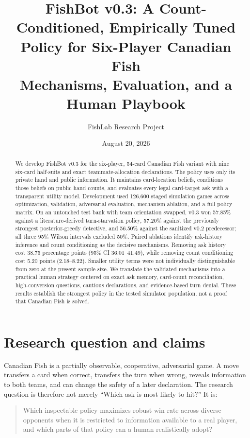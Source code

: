 \documentclass[11pt]{article}
\title{\textbf{FishBot v0.3: A Count-Conditioned, Empirically Tuned Policy for Six-Player Canadian Fish}\\[4pt]
\large Mechanisms, Evaluation, and a Human Playbook}
\author{FishLab Research Project}
\date{August 20, 2026}
\begin{document}
\maketitle

\begin{abstract}
We develop FishBot v0.3 for the six-player, 54-card Canadian Fish variant with nine six-card half-suits and exact teammate-allocation declarations. The policy uses only its private hand and public information. It maintains card-location beliefs, conditions those beliefs on public hand counts, and evaluates every legal card-target ask with a transparent utility model. Development used 126,600 staged simulation games across optimization, validation, adversarial evaluation, mechanism ablation, and a full policy matrix. On an untouched test bank with team orientation swapped, v0.3 won 57.85\% against a literature-derived turn-starvation policy, 57.20\% against the previously strongest posterior-greedy detective, and 56.50\% against the sanitized v0.2 predecessor; all three 95\% Wilson intervals excluded 50\%. Paired ablations identify ask-history inference and count conditioning as the decisive mechanisms. Removing ask history cost 38.75 percentage points (95\% CI 36.01--41.49), while removing count conditioning cost 5.20 points (2.18--8.22). Smaller utility terms were not individually distinguishable from zero at the present sample size. We translate the validated mechanisms into a practical human strategy centered on exact ask memory, card-count reconciliation, high-conversion questions, cautious declarations, and evidence-based turn denial. These results establish the strongest policy in the tested simulator population, not a proof that Canadian Fish is solved.
\end{abstract}

\section{Research question and claims}

Canadian Fish is a partially observable, cooperative, adversarial game. A move transfers a card when correct, transfers the turn when wrong, reveals information to both teams, and can change the safety of a later declaration. The research question is therefore not merely ``Which ask is most likely to hit?'' It is:

\begin{quote}
Which inspectable policy maximizes robust win rate across diverse opponents when it is restricted to information available to a real player, and which parts of that policy can a human realistically adopt?
\end{quote}
\end{document}
